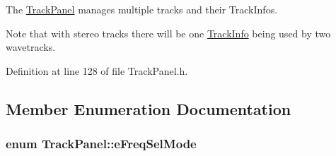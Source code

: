 The \hyperlink{class_track_panel}{Track\+Panel} manages multiple tracks and their Track\+Infos.

Note that with stereo tracks there will be one \hyperlink{class_track_info}{Track\+Info} being used by two wavetracks. 

Definition at line 128 of file Track\+Panel.\+h.



\subsection{Member Enumeration Documentation}
\subsubsection[{\texorpdfstring{e\+Freq\+Sel\+Mode}{eFreqSelMode}}]{\setlength{\rightskip}{0pt plus 5cm}enum {\bf Track\+Panel\+::e\+Freq\+Sel\+Mode}\hspace{0.3cm}{\ttfamily [protected]}}\hypertarget{class_track_panel_a84990c0ee0f5d646ae93808d15f458bf}{}\label{class_track_panel_a84990c0ee0f5d646ae93808d15f458bf}
